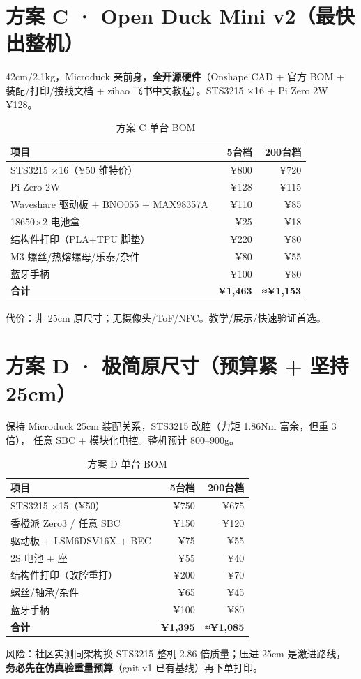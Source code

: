 \documentclass[11pt,a4paper]{ctexart}
\begin{document}
\section{方案 C · Open Duck Mini v2（最快出整机）}
42cm/2.1kg，Microduck 亲前身，\textbf{全开源硬件}（Onshape CAD + 官方 BOM +
装配/打印/接线文档 + zihao 飞书中文教程）。STS3215 ×16 + Pi Zero 2W ¥128。
\begin{table}[h]\centering\small
\begin{tabular}{@{}L{5.5cm}rr@{}}
\toprule
{} 项目 & 5台档 & 200台档\\
\midrule
STS3215 ×16（¥50 维特价） & ¥800 & ¥720\\
Pi Zero 2W & ¥128 & ¥115\\
Waveshare 驱动板 + BNO055 + MAX98357A & ¥110 & ¥85\\
18650×2 电池盒 & ¥25 & ¥18\\
结构件打印（PLA+TPU 脚垫） & ¥220 & ¥80\\
M3 螺丝/热熔螺母/乐泰/杂件 & ¥80 & ¥55\\
蓝牙手柄 & ¥100 & ¥80\\
\midrule
\textbf{合计} & \textbf{¥1{,}463} & \textbf{≈¥1{,}153}\\
\bottomrule
\end{tabular}
\caption{方案 C 单台 BOM}
\end{table}
代价：非 25cm 原尺寸；无摄像头/ToF/NFC。教学/展示/快速验证首选。

\section{方案 D · 极简原尺寸（预算紧 + 坚持 25cm）}
保持 Microduck 25cm 装配关系，STS3215 改腔（力矩 1.86Nm 富余，但重 3 倍），
任意 SBC + 模块化电控。整机预计 800--900g。
\begin{table}[h]\centering\small
\begin{tabular}{@{}L{5.5cm}rr@{}}
\toprule
{} 项目 & 5台档 & 200台档\\
\midrule
STS3215 ×15（¥50） & ¥750 & ¥675\\
香橙派 Zero3 / 任意 SBC & ¥150 & ¥120\\
驱动板 + LSM6DSV16X + BEC & ¥75 & ¥55\\
2S 电池 + 座 & ¥55 & ¥40\\
结构件打印（改腔重打） & ¥200 & ¥70\\
螺丝/轴承/杂件 & ¥65 & ¥45\\
蓝牙手柄 & ¥100 & ¥80\\
\midrule
\textbf{合计} & \textbf{¥1{,}395} & \textbf{≈¥1{,}085}\\
\bottomrule
\end{tabular}
\caption{方案 D 单台 BOM}
\end{table}
风险：社区实测同架构换 STS3215 整机 2.86 倍质量；压进 25cm 是激进路线，
\textbf{务必先在仿真验重量预算}（gait-v1 已有基线）再下单打印。
\end{document}

